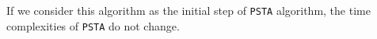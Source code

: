 If we consider this algorithm as the initial step of {\tt PSTA} algorithm, the time complexities of {\tt PSTA} do not change.



















